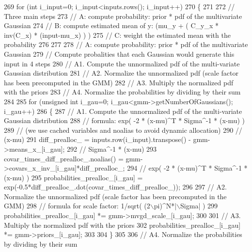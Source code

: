 \begin{DoxyCode}
269   \textcolor{keywordflow}{for} (\textcolor{keywordtype}{int} i\_input=0; i\_input<inputs.rows(); i\_input++)
270   \{
271     
272     \textcolor{comment}{// Three main steps}
273     \textcolor{comment}{// A: compute probability: prior * pdf of the multivariate Gaussian}
274     \textcolor{comment}{// B: compute estimated mean of y: (mu\_y + ( C\_y\_x * inv(C\_x) * (input-mu\_x) ) )}
275     \textcolor{comment}{// C: weight the estimated mean with the probability}
276     
277     
278     \textcolor{comment}{// A: compute probability: prior * pdf of the multivariate Gaussian}
279     \textcolor{comment}{// Compute probalities that each Gaussian would generate this input in 4 steps}
280     \textcolor{comment}{// A1. Compute the unnormalized pdf of the multi-variate Gaussian distribution}
281     \textcolor{comment}{// A2. Normalize the unnormalized pdf (scale factor has been precomputed in the GMM)}
282     \textcolor{comment}{// A3. Multiply the normalized pdf with the priors}
283     \textcolor{comment}{// A4. Normalize the probabilities by dividing by their sum}
284   
285     \textcolor{keywordflow}{for} (\textcolor{keywordtype}{unsigned} \textcolor{keywordtype}{int} i\_gau=0; i\_gau<gmm->getNumberOfGaussians(); i\_gau++)
286     \{
287       \textcolor{comment}{// A1. Compute the unnormalized pdf of the multi-variate Gaussian distribution}
288       \textcolor{comment}{// formula: exp( -2 * (x-mu)^T * Sigma^-1 * (x-mu) )}
289       \textcolor{comment}{// (we use cached variables and noalias to avoid dynamic allocation)}
290       \textcolor{comment}{// (x-mu)}
291       diff\_prealloc\_ = inputs.row(i\_input).transpose() - gmm->means\_x\_[i\_gau];
292       \textcolor{comment}{// Sigma^-1 * (x-mu)}
293       covar\_times\_diff\_prealloc\_.noalias() = gmm->covars\_x\_inv\_[i\_gau]*diff\_prealloc\_;
294       \textcolor{comment}{// exp( -2 * (x-mu)^T * Sigma^-1 * (x-mu) )}
295       probabilities\_prealloc\_[i\_gau] = exp(-0.5*diff\_prealloc\_.dot(covar\_times\_diff\_prealloc\_));
296       
297       \textcolor{comment}{// A2. Normalize the unnormalized pdf (scale factor has been precomputed in the GMM)}
298       \textcolor{comment}{// formula for scale factor: 1/sqrt( (2\(\backslash\)pi)^N*|\(\backslash\)Sigma| )}
299       probabilities\_prealloc\_[i\_gau] *= gmm->mvgd\_scale\_[i\_gau];
300       
301       \textcolor{comment}{// A3. Multiply the normalized pdf with the priors}
302       probabilities\_prealloc\_[i\_gau] *= gmm->priors\_[i\_gau];
303       
304     \}
305     
306     \textcolor{comment}{// A4. Normalize the probabilities by dividing by their sum}

\end{DoxyCode}
